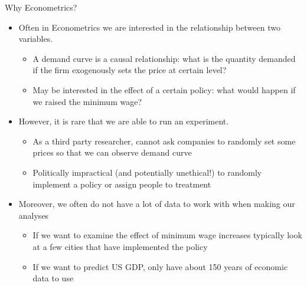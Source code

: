 \documentclass[notheorems,9pt]{beamer}
\begin{document}
\begin{frame}[t]{Why Econometrics?}
	\begin{minipage}[t][0.5\textheight]{\textwidth}
	\begin{itemize}
		\item<1-> Often in Econometrics we are interested in the  relationship between two variables.
		\begin{itemize}
			\item<2-3|only@2-3> A demand curve is a causal relationship: what is the quantity demanded if the firm exogenously sets the price at  certain level?
			\item<3|only@3> May be interested in the effect of a certain policy: what would happen if we raised the minimum wage?
		\end{itemize}
		\item<4-> However, it is rare that we are able to run an experiment. 
		\begin{itemize}
			\item<5-6|only@5-6> As a third party researcher, cannot ask companies to randomly set some prices so that we can observe demand curve
			\item<6|only@6> Politically impractical (and potentially unethical!) to randomly implement a policy or assign people to treatment
		\end{itemize}
		\item<7-> Moreover, we often do not have a lot of data to work with when making our analyses
		\begin{itemize}
			\item<8-9|only@8-9> If we want to examine the effect of minimum wage increases typically look at a few cities that have implemented the policy
			\item<9|only@9> If we want to predict US GDP, only have about 150 years of economic data to use
		\end{itemize}
	\end{itemize}
	\end{minipage}
	\vfill
	\begin{center}
	{}
	\end{center}
\end{frame}
\end{document}
